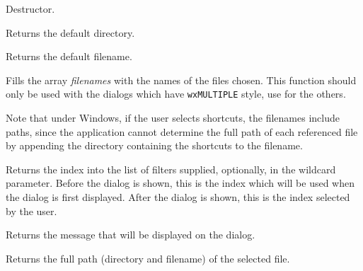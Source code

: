 \label{wxfiledialogdtor}


Destructor.

\label{wxfiledialoggetdirectory}


Returns the default directory.

\label{wxfiledialoggetfilename}


Returns the default filename.

\label{wxfiledialoggetfilenames}


Fills the array {\it filenames} with the names of the files chosen. This
function should only be used with the dialogs which have {\tt wxMULTIPLE} style,
use  for the others.

Note that under Windows, if the user selects shortcuts, the filenames
include paths, since the application cannot determine the full path
of each referenced file by appending the directory containing the shortcuts
to the filename.

\label{wxfiledialoggetfilterindex}


Returns the index into the list of filters supplied, optionally, in the wildcard parameter.
Before the dialog is shown, this is the index which will be used when the dialog is first displayed.
After the dialog is shown, this is the index selected by the user.

\label{wxfiledialoggetmessage}


Returns the message that will be displayed on the dialog.

\label{wxfiledialoggetpath}


Returns the full path (directory and filename) of the selected file.

